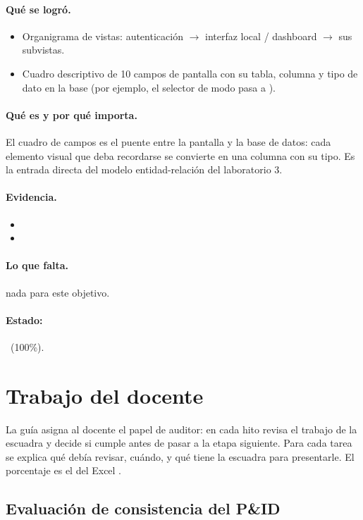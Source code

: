 \documentclass[a4paper,11pt]{article}
\begin{document}
\paragraph{Qué se logró.}
\begin{itemize}
\item Organigrama de vistas: autenticación $\to$ interfaz local / dashboard $\to$ sus subvistas.
\item Cuadro descriptivo de 10 campos de pantalla con su tabla, columna y tipo de dato en la base (por ejemplo, el selector de modo pasa a ).
\end{itemize}
\paragraph{Qué es y por qué importa.} El cuadro de campos es el puente entre la pantalla y la base de datos: cada elemento visual que deba recordarse se convierte en una columna con su tipo. Es la entrada directa del modelo entidad-relación del laboratorio 3.
\paragraph{Evidencia.}
\begin{itemize}\small
\item {}
\item {}
\end{itemize}
\paragraph{Lo que falta.} nada para este objetivo.
\paragraph{Estado:} \cumple~(100\%).
\section{Trabajo del docente}
La guía asigna al docente el papel de auditor: en cada hito revisa el trabajo de la escuadra y decide si cumple antes de pasar a la etapa siguiente. Para cada tarea se explica qué debía revisar, cuándo, y qué tiene la escuadra para presentarle. El porcentaje es el del Excel .
\subsection{Evaluación de consistencia del P\&ID}
\end{document}
